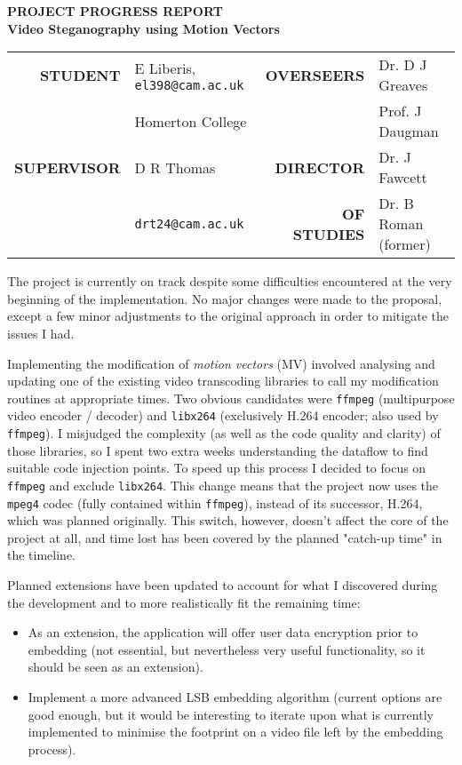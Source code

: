 \documentclass[11pt,british,usenames,dvipsnames,hypens,final]{scrartcl}
\numberwithin{equation}{section}
\numberwithin{figure}{section}
\newcommand{\textsbc}[1]{\sffamily \textsc{\textbf{#1}}}
\begin{document}
{%
\centering
\textsbc{PROJECT PROGRESS REPORT} \\
\huge \sffamily \textbf{Video Steganography using Motion Vectors}
\par\bigskip
}

{\centering
\begin{tabular}{rlrl}
\textsbc{STUDENT} & E Liberis, \texttt{el398@cam.ac.uk} & \textsbc{OVERSEERS} & Dr. D J Greaves\\
                  & Homerton College                    &                     & Prof. J Daugman\\[4pt]
\textsbc{SUPERVISOR} & D R Thomas               & \textsbc{DIRECTOR}   & Dr. J Fawcett\\
                     & \texttt{drt24@cam.ac.uk} & \textsbc{OF STUDIES} & Dr. B Roman (former)
\end{tabular}
\par\bigskip
}

The project is currently on track despite some difficulties encountered at the very beginning of the implementation. No major changes were made to the proposal, except a few minor adjustments to the original approach in order to mitigate the issues I had.

Implementing the modification of \emph{motion vectors} (MV) involved analysing and updating one of the existing video transcoding libraries to call my modification routines at appropriate times. Two obvious candidates were \texttt{ffmpeg} (multipurpose video encoder / decoder) and \texttt{libx264} (exclusively H.264 encoder; also used by \texttt{ffmpeg}). I misjudged the complexity (as well as the code quality and clarity) of those libraries, so I spent two extra weeks understanding the dataflow to find suitable code injection points. To speed up this process I decided to focus on \texttt{ffmpeg} and exclude \texttt{libx264}. This change means that the project now uses the  \texttt{mpeg4} codec (fully contained within \texttt{ffmpeg}), instead of its successor, H.264, which was planned originally. This switch, however, doesn't affect the core of the project at all, and time lost has been covered by the planned "catch-up time" in the timeline.

Planned extensions have been updated to account for what I discovered during the development and to more realistically fit the remaining time:
\begin{itemize}
\item As an extension, the application will offer user data encryption prior to embedding (not essential, but nevertheless very useful functionality, so it should be seen as an extension).
\item Implement a more advanced LSB embedding algorithm (current options are good enough, but it would be interesting to iterate upon what is currently implemented to minimise the footprint on a video file left by the embedding process).
\end{itemize}
\end{document}
